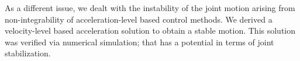 As a different issue,
we dealt with the instability of the joint motion
arising from non-integrability of acceleration-level based control methods.
We derived a velocity-level based acceleration solution to obtain a stable motion.
This solution was verified via numerical simulation;
that has a potential in terms of joint stabilization.








%
%
